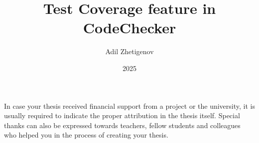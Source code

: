 \documentclass[
]{elteikthesis}[2024/04/26]
\title{Test Coverage feature in CodeChecker} %
\date{2025} %
\author{Adil Zhetigenov} %
\affiliation{Associate Professor, habil.PhD } %
\begin{document}


\maketitle
%

\tableofcontents
\cleardoublepage


\cleardoublepage


\cleardoublepage


\cleardoublepage


\cleardoublepage

\chapter*{\acklabel}
In case your thesis received financial support from a project or the university, it is usually required to indicate the proper attribution in the thesis itself. Special thanks can also be expressed towards teachers, fellow students and colleagues who helped you in the process of creating your thesis.

\appendix

\cleardoublepage

{}
\printbibliography[title=\biblabel]
\cleardoublepage

{}
\listoffigures
\cleardoublepage

{}
\listoftables
\cleardoublepage

{}
\listofalgorithms
\cleardoublepage

{}
\lstlistoflistings
\cleardoublepage

\end{document}
